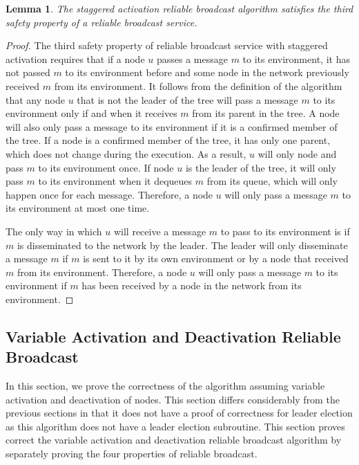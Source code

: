 \documentclass[english]{article}
\newtheorem{lemma}[theorem]{Lemma}
\begin{document}
\begin{lemma}
\label{StaggeredRBSafety3}
The staggered activation reliable broadcast algorithm satisfies the third safety property of a reliable broadcast service.
\end{lemma}
\begin{proof}

The third safety property of reliable broadcast service with staggered activation requires that if a node $u$ passes a message $m$ to its environment, it has not passed $m$ to its environment before and some node in the network previously received $m$ from its environment. It follows from the definition of  the algorithm that any node $u$ that is not the leader of the tree will pass a message $m$ to its environment only if and when it receives $m$ from its parent in the tree. A node will also only pass a message to its environment if it is a confirmed member of the tree. If a node is a confirmed member of the tree, it has only one parent, which does not change during the execution. As a result, $u$ will only node and pass $m$ to its environment once. If node $u$ is the leader of the tree, it will only pass $m$ to its environment when it dequeues $m$ from its queue, which will only happen once for each message. Therefore, a node $u$ will only pass a message $m$ to its environment at most one time.

The only way in which $u$ will receive a message $m$ to pass to its environment is if $m$ is disseminated to the network by the leader. The leader will only disseminate a message $m$ if $m$ is sent to it by its own environment or by a node that received $m$ from its environment. Therefore, a node $u$ will only pass a message $m$ to its environment if $m$ has been received by a node in the network from its environment.

\end{proof}

\subsection {Variable Activation and Deactivation Reliable Broadcast}

In this section, we prove the correctness of the algorithm assuming variable activation and deactivation of nodes. This section differs considerably from the previous sections in that it does not have a proof of correctness for leader election as this algorithm does not have a leader election subroutine. This section proves correct the variable activation and deactivation reliable broadcast algorithm by separately proving the four properties of reliable broadcast.
\end{document}
